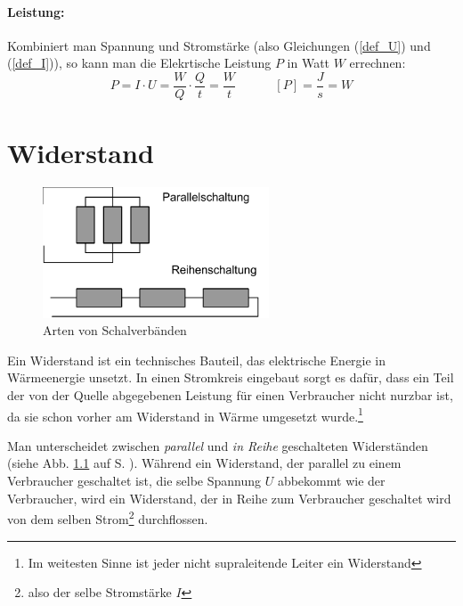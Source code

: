 \subsubsection{Leistung: }
Kombiniert man Spannung und Stromstärke (also Gleichungen (\ref{def_U}) und (\ref{def_I})), so kann man die Elekrtische Leistung \(P\) in Watt \(W\) errechnen: 
	\begin{equation}
	P = I \cdot U = \frac{W}{Q} \cdot \frac{Q}{t} = \frac{W}{t} ~~~~~~~~~~~~~~ [P] = \frac{J}{s}=W
	\label{def_P}
	\end{equation}
	
	
		\chapter{Widerstand}
		
		\begin{figure}
		\centering
		\includegraphics[width=0.6\textwidth]{mat/schaltungen}
		\caption{Arten von Schalverbänden}
		\label{img_schaltungen}
		\end{figure}
		
Ein Widerstand ist ein technisches Bauteil, das elektrische Energie in Wärmeenergie unsetzt. In einen Stromkreis eingebaut sorgt es dafür, dass ein Teil der von der Quelle abgegebenen Leistung für einen Verbraucher nicht nurzbar ist, da sie schon vorher am Widerstand in Wärme umgesetzt wurde.\footnote{Im weitesten Sinne ist jeder nicht supraleitende Leiter ein Widerstand}

Man unterscheidet zwischen \textit{parallel} und \textit{in Reihe} geschalteten Widerständen (siehe Abb. \ref{img_schaltungen} auf S. \pageref{img_schaltungen}). Während ein Widerstand, der parallel zu einem Verbraucher geschaltet ist, die selbe Spannung \(U\) abbekommt wie der Verbraucher, wird ein Widerstand, der in Reihe zum Verbraucher geschaltet wird von dem selben Strom\footnote{also der selbe Stromstärke \(I\)} durchflossen.

